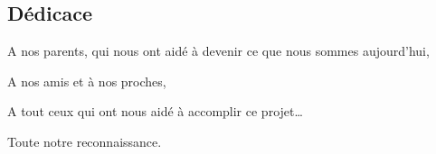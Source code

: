 \begin{center}
\section*{Dédicace}
\end{center}

\large
\noindent
A nos parents, qui nous ont aidé à devenir ce que nous sommes aujourd’hui,\par
\vspace{12pt}
\noindent
A nos amis et à nos proches,\par
\vspace{12pt}
\noindent
A tout ceux qui ont nous aidé à accomplir ce projet…\par
\vspace{12pt}
\noindent
Toute notre reconnaissance.

\newpage
